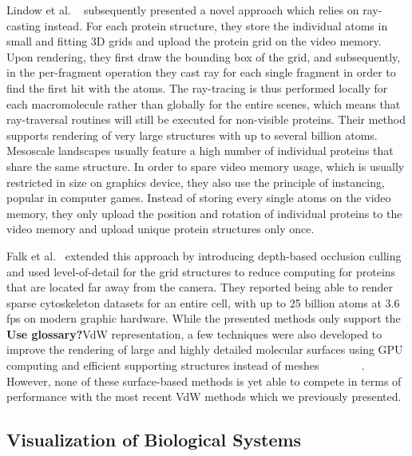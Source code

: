 Lindow et al. ~\cite{lindow2012interactive} subsequently presented a novel approach which relies on ray-casting instead.
For each protein structure, they store the individual atoms in small and fitting 3D grids and upload the protein grid on the video memory.
Upon rendering, they first draw the bounding box of the grid, and subsequently, in the per-fragment operation they cast ray for each single fragment in order to find the first hit with the atoms.
The ray-tracing is thus performed locally for each macromolecule rather than globally for the entire scenes, which means that ray-traversal routines will still be executed for non-visible proteins.
Their method supports rendering of very large structures with up to several billion atoms.
Mesoscale landscapes usually feature a high number of individual proteins that share the same structure.
In order to spare video memory usage, which is usually restricted in size on graphics device, they also use the principle of instancing, popular in computer games.
Instead of storing every single atoms on the video memory, they only upload the position and rotation of individual proteins to the video memory and upload unique protein structures only once.

Falk et al.~\cite{falk2013atomistic} extended this approach by introducing depth-based occlusion culling and used level-of-detail for the grid structures to reduce computing for proteins that are located far away from the camera.
They reported being able to render sparse cytoskeleton datasets for an entire cell, with up to 25 billion atoms at 3.6 fps on modern graphic hardware.
While the presented methods only support the \textbf{Use glossary?}VdW representation, a few techniques were also developed to improve the rendering of large and highly detailed molecular surfaces using GPU computing and efficient supporting structures instead of meshes ~\cite{krone2012fast}~\cite{parulek2012implicit} ~\cite{parulek2013fast} ~\cite{krone2011parallel} ~\cite{szecsi2012real}. 
However, none of these surface-based methods is yet able to compete in terms of performance with the most recent VdW methods which we previously presented.


\subsection{Visualization of Biological Systems}

